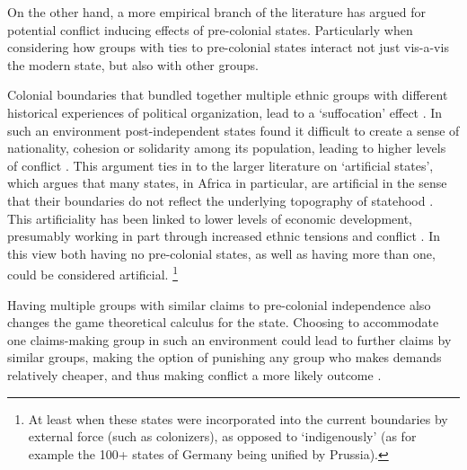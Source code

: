 \documentclass[12pt]{article}
\begin{document}
On the other hand, a more empirical branch of the literature has argued for 
potential conflict inducing effects of pre-colonial states. Particularly when
considering how groups with ties to pre-colonial states interact not just
vis-a-vis the modern state, but also with other groups.

Colonial boundaries that bundled together multiple ethnic groups with
different historical experiences of political organization, lead
to a `suffocation' effect \citep{Englebert2002}. In such an environment
post-independent states found it difficult to create a sense of nationality,
cohesion or solidarity among its population, leading to higher levels of
conflict \citep{Englebert2002}. This argument ties in to the larger literature
on `artificial states', which argues that many states, in Africa in particular,
are artificial in the sense that their boundaries do not reflect the underlying
topography of statehood \citep{Alesina2011}. This artificiality has been linked
to lower levels of economic development, presumably working in part through
increased ethnic tensions and conflict \citep{Alesina2011}. In this view both
having no pre-colonial states, as well as having more than one, could be
considered artificial. %
\footnote{At least when these states were incorporated
into the current boundaries by external force (such as colonizers), as opposed
to `indigenously' (as for example the 100+ states of Germany being unified by
Prussia).} 

Having multiple groups with similar claims to pre-colonial independence also
changes the game theoretical calculus for the state. Choosing to accommodate one
claims-making group in such an environment could lead to further claims by
similar groups, making the option of punishing any group who makes demands
relatively cheaper, and thus making conflict a more likely outcome
\citep{Wishman}.
\end{document}
